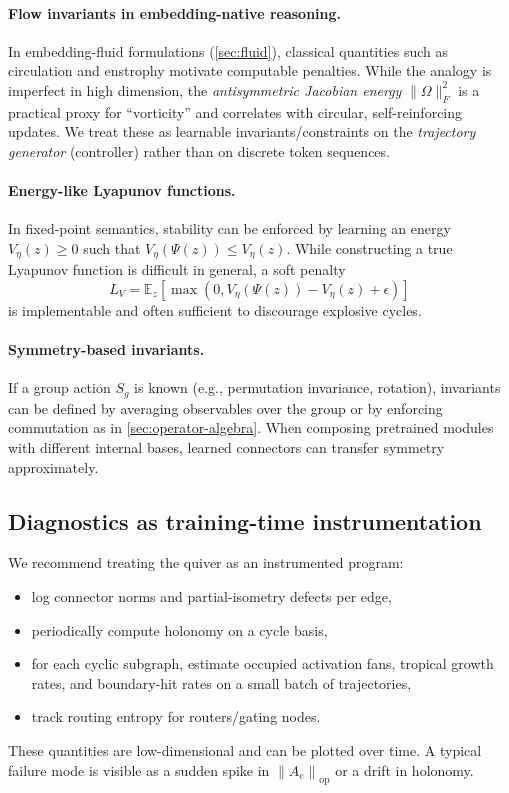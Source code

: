 \documentclass[11pt]{article}
\theoremstyle{definition}
\theoremstyle{plain}
\theoremstyle{remark}
\newcommand{\E}{\mathbb{E}}
\newcommand{\opnorm}[1]{\left\lVert #1 \right\rVert_{\mathrm{op}}}
\begin{document}
\paragraph{Flow invariants in embedding-native reasoning.}
In embedding-fluid formulations (\cref{sec:fluid}), classical quantities such as circulation and enstrophy motivate computable penalties.
While the analogy is imperfect in high dimension, the \emph{antisymmetric Jacobian energy} $\|\Omega\|_F^2$ is a practical proxy for ``vorticity'' and correlates with circular, self-reinforcing updates.
We treat these as learnable invariants/constraints on the \emph{trajectory generator} (controller) rather than on discrete token sequences.

\paragraph{Energy-like Lyapunov functions.}
In fixed-point semantics, stability can be enforced by learning an energy $V_\eta(z)\ge 0$ such that $V_\eta(\Psi(z))\le V_\eta(z)$.
While constructing a true Lyapunov function is difficult in general, a soft penalty
\[
L_V = \E_z\left[\max(0, V_\eta(\Psi(z))-V_\eta(z)+\epsilon)\right]
\]
is implementable and often sufficient to discourage explosive cycles.

\paragraph{Symmetry-based invariants.}
If a group action $S_g$ is known (e.g., permutation invariance, rotation), invariants can be defined by averaging observables over the group or by enforcing commutation as in \cref{sec:operator-algebra}.
When composing pretrained modules with different internal bases, learned connectors can transfer symmetry approximately.

\subsection{Diagnostics as training-time instrumentation}
\label{sec:instrumentation}

We recommend treating the quiver as an instrumented program:
\begin{itemize}[leftmargin=2em]
\item log connector norms and partial-isometry defects per edge,
	\item periodically compute holonomy on a cycle basis,
	\item for each cyclic subgraph, estimate occupied activation fans, tropical growth rates, and boundary-hit rates on a small batch of trajectories,
	\item track routing entropy for routers/gating nodes.
\end{itemize}
These quantities are low-dimensional and can be plotted over time.
A typical failure mode is visible as a sudden spike in $\opnorm{A_e}$ or a drift in holonomy.
\end{document}
